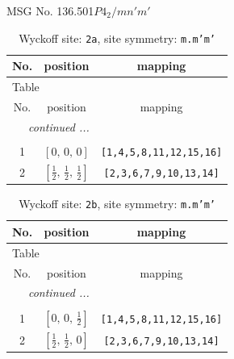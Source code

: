 \documentclass[fleqn,8pt]{jsarticle}
\begin{document}
\setcounter{MaxMatrixCols}{32}

\renewcommand{\tablename}{Table~}
\renewcommand{\figurename}{Figure~}
\begin{center}
\LARGE
MSG No. 136.501\quad$P4_{2}/mn'm'$
\end{center}
\renewcommand{\arraystretch}{1.2}
\begin{longtable}{ccc}
\caption{Wyckoff site: {\tt 2a}, site symmetry: {\tt m.m'm'}}
 \\
 \hline \hline
No. & position & mapping \\ \hline \endfirsthead

\multicolumn{2}{l}{\tablename\ \thetable{}} \\
 \hline \hline
No. & position & mapping \\ \hline \endhead

 \hline \hline
\multicolumn{2}{r}{\footnotesize\it continued ...} \\ \endfoot

 \hline \hline
\multicolumn{2}{r}{} \\ \endlastfoot

1 & $\left[ 0,\, 0,\, 0 \right]$ & {\tt [1,4,5,8,11,12,15,16]} \\ \hline
2 & $\left[ \frac{1}{2},\, \frac{1}{2},\, \frac{1}{2} \right]$ & {\tt [2,3,6,7,9,10,13,14]} \\
\end{longtable}
\renewcommand{\arraystretch}{1.2}
\begin{longtable}{ccc}
\caption{Wyckoff site: {\tt 2b}, site symmetry: {\tt m.m'm'}}
 \\
 \hline \hline
No. & position & mapping \\ \hline \endfirsthead

\multicolumn{2}{l}{\tablename\ \thetable{}} \\
 \hline \hline
No. & position & mapping \\ \hline \endhead

 \hline \hline
\multicolumn{2}{r}{\footnotesize\it continued ...} \\ \endfoot

 \hline \hline
\multicolumn{2}{r}{} \\ \endlastfoot

1 & $\left[ 0,\, 0,\, \frac{1}{2} \right]$ & {\tt [1,4,5,8,11,12,15,16]} \\ \hline
2 & $\left[ \frac{1}{2},\, \frac{1}{2},\, 0 \right]$ & {\tt [2,3,6,7,9,10,13,14]} \\
\end{longtable}
\end{document}
